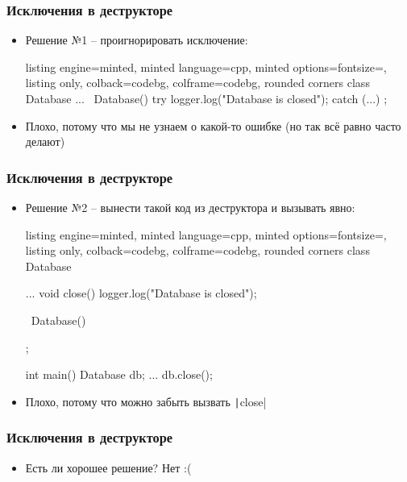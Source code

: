 \documentclass[10pt]{beamer}
\begin{document}
\begin{frame}[fragile]
\frametitle{Исключения в деструкторе}
\begin{itemize}
\item Решение №1 -- проигнорировать исключение:
\begin{tcblisting}{listing engine=minted, minted language=cpp, minted options={fontsize=\scriptsize}, listing only, colback=codebg, colframe=codebg, rounded corners}
class Database {
  ...
  ~Database() {
    try {
      logger.log("Database is closed");
    }
    catch (...) {}
  }
};
\end{tcblisting}
\pause
\item Плохо, потому что мы не узнаем о какой-то ошибке (но так всё равно часто делают)
\end{itemize}
\end{frame}

\begin{frame}[fragile]
\frametitle{Исключения в деструкторе}
\begin{itemize}
\item Решение №2 -- вынести такой код из деструктора и вызывать явно:
\begin{tcblisting}{listing engine=minted, minted language=cpp, minted options={fontsize=\scriptsize}, listing only, colback=codebg, colframe=codebg, rounded corners}
class Database {
  ...
  void close() {
    logger.log("Database is closed");
  }

  ~Database() {}
};

int main() {
  Database db;
  ...
  db.close();
}
\end{tcblisting}
\pause
{}
\item Плохо, потому что можно забыть вызвать \texttt|close|
\end{itemize}
\end{frame}

\begin{frame}[fragile]
\frametitle{Исключения в деструкторе}
\begin{itemize}
\item Есть ли хорошее решение? \pause Нет :(
\end{itemize}
\end{frame}
\end{document}

